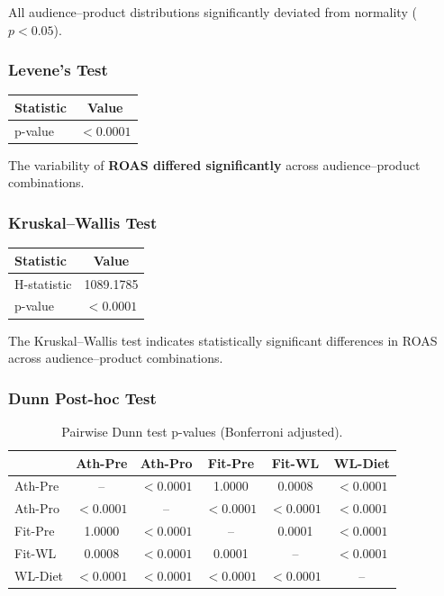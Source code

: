 All audience--product distributions significantly deviated from normality ($p<0.05$).

\vspace{0.3cm}

\subsubsection{Levene's Test}

\begin{table}[H]
	\centering
	\begin{tabular}{lc}
		\toprule
		Statistic & Value \\
		\midrule
		p-value & $<0.0001$ \\
		\bottomrule
	\end{tabular}
\end{table}

The variability of \textbf{ROAS differed significantly} across audience--product combinations.

\vspace{0.3cm}

\subsubsection{Kruskal--Wallis Test}

\begin{table}[H]
	\centering
	\begin{tabular}{lc}
		\toprule
		Statistic & Value \\
		\midrule
		H-statistic & 1089.1785 \\
		p-value & $<0.0001$ \\
		\bottomrule
	\end{tabular}
\end{table}

The Kruskal--Wallis test indicates statistically significant differences in ROAS across audience--product combinations.

\vspace{0.3cm}

\subsubsection{Dunn Post-hoc Test}

\begin{table}[H]
	\centering
	\caption{Pairwise Dunn test p-values (Bonferroni adjusted).}
	\begin{tabular}{lccccc}
		\toprule
		& Ath-Pre & Ath-Pro & Fit-Pre & Fit-WL & WL-Diet \\
		\midrule
		Ath-Pre & -- & $<0.0001$ & 1.0000 & 0.0008 & $<0.0001$ \\
		Ath-Pro & $<0.0001$ & -- & $<0.0001$ & $<0.0001$ & $<0.0001$ \\
		Fit-Pre & 1.0000 & $<0.0001$ & -- & 0.0001 & $<0.0001$ \\
		Fit-WL & 0.0008 & $<0.0001$ & 0.0001 & -- & $<0.0001$ \\
		WL-Diet & $<0.0001$ & $<0.0001$ & $<0.0001$ & $<0.0001$ & -- \\
		\bottomrule
	\end{tabular}
\end{table}

